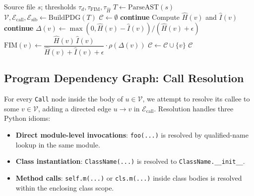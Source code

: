 \begin{algorithm}[h]
\caption{Single-function FIM target selection for one file.}
\label{alg:selection}
\begin{algorithmic}[1]
  \Require Source file $s$; thresholds $\tau_d, \tau_{\mathrm{FIM}}, \tau_{\hat H}$
  \State $T \gets \mathrm{ParseAST}(s)$
  \State $\mathcal{V}, \mathcal{E}_{\mathrm{call}}, \mathcal{E}_{\mathrm{sib}} \gets \mathrm{BuildPDG}(T)$
  \State $\mathcal{C} \gets \emptyset$
      \State \textbf{continue}
    \EndIf
    \State Compute $\hat{H}(v)$ and $\hat{I}(v)$
     \textbf{continue} \EndIf
    \State $\Delta(v) \gets \max(0, \hat{H}(v)-\hat{I}(v)) / (\hat{H}(v)+\epsilon)$
    \State $\mathrm{FIM}(v) \gets \dfrac{\hat{H}(v)\,\hat{I}(v)}{\hat{H}(v)+\hat{I}(v)+\epsilon}\cdot \rho(\Delta(v))$
      \State $\mathcal{C} \gets \mathcal{C} \cup \{v\}$
    \EndIf
  \EndFor
  \State \Return $\mathcal{C}$ 
\end{algorithmic}
\end{algorithm}

\subsection{Program Dependency Graph: Call Resolution}
\label{app:algo:pdg}

For every \texttt{Call} node inside the body of $u \in \mathcal{V}$, we
attempt to resolve its callee to some $v \in \mathcal{V}$, adding a
directed edge $u \to v$ in $\mathcal{E}_{\mathrm{call}}$. Resolution
handles three Python idioms:

\begin{itemize}\setlength\itemsep{0.1em}
  \item \textbf{Direct module-level invocations}: \texttt{foo(...)} is
        resolved by qualified-name lookup in the same module.
  \item \textbf{Class instantiation}: \texttt{ClassName(...)} is
        resolved to \texttt{ClassName.\_\_init\_\_}.
  \item \textbf{Method calls}: \texttt{self.m(...)} or \texttt{cls.m(...)}
        inside class bodies is resolved within the enclosing class scope.
\end{itemize}

